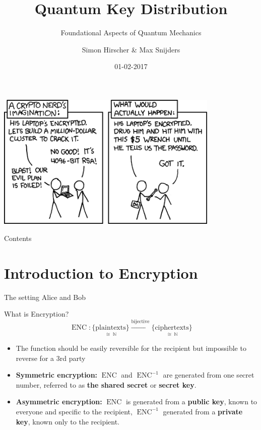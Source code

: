 \documentclass{beamer}
\title{Quantum Key Distribution}
\subtitle{Foundational Aspects of Quantum Mechanics}
\date{01-02-2017}
\author[Hirscher, Snijders]{Simon Hirscher \& Max Snijders}
\begin{document}
	\begin{frame}
		\begin{center}
		\includegraphics[width=0.8\textwidth]{images/xkcd-security.png}
		\end{center}
	\end{frame}

	\begin{frame}
		\titlepage
	\end{frame}

	\begin{frame}{Contents} %
		\tableofcontents
	\end{frame}

	\section{Introduction to Encryption}
	\begin{frame}{The setting}
		Alice and Bob
	\end{frame}

	\begin{frame}{What is Encryption?} %
		\begin{equation}
			\operatorname{ENC}: \underset{\cong\;\mathbb{N}}{\{\text{plaintexts}\}}
						\overset{\text{bijective}}{\longrightarrow}
						\underset{\cong\;\mathbb{N}}{\{\text{ciphertexts}\}}\nonumber
		\end{equation}
		\begin{itemize}
			\item The function should be easily reversible for the
			recipient but impossible to reverse for a 3rd party

 			\item \textbf{Symmetric encryption:} $\operatorname{ENC}$
 			and $\operatorname{ENC}^{-1}$ are generated from one secret
 			number, referred to as \textbf{the shared secret} or
 			\textbf{secret key}.

 			\item \textbf{Asymmetric encryption:} $\operatorname{ENC}$
 			is generated from a \textbf{public key}, known to everyone
 			and specific to the recipient, $\operatorname{ENC}^{-1}$
 			generated from a \textbf{private key}, known only to the
 			recipient.

		\end{itemize}
	\end{frame}
\end{document}
